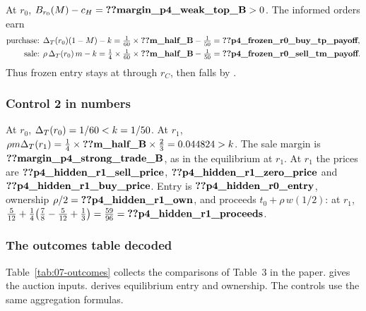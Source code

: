 At \(r_0\), \(B_{r_0}(M)-c_H=\reg{margin_p4_weak_top_B}>0\). The informed orders earn
\begin{align*}
\text{purchase: }&\DT(r_0)(1-M)-k=\tfrac1{60}\times\reg{m_half_B}-\tfrac1{50}=\reg{p4_frozen_r0_buy_tp_payoff},\\
\text{sale: }&\rho\,\DT(r_0)\,m-k=\tfrac14\times\tfrac1{60}\times\reg{m_half_B}-\tfrac1{50}=\reg{p4_frozen_r0_sell_tm_payoff}.
\end{align*}
Thus frozen entry stays at  through \(r_C\), then falls by .

\subsubsection{Control 2 in numbers}

At \(r_0\), \(\Delta_T(r_0)=1/60<k=1/50\). At \(r_1\),
\(\rho m\DT(r_1)=\tfrac14\times\reg{m_half_B}\times\tfrac23=0.044824>k\).
The sale margin is \(\reg{margin_p4_strong_trade_B}\), as in the equilibrium at \(r_1\).
At \(r_1\) the prices are \(\reg{p4_hidden_r1_sell_price}\), \(\reg{p4_hidden_r1_zero_price}\) and
\(\reg{p4_hidden_r1_buy_price}\). Entry is
\(\reg{p4_hidden_r0_entry}\), ownership \(\rho/2=\reg{p4_hidden_r1_own}\), and proceeds \(t_0+\rho\,w(1/2)\): at \(r_1\),
\(\tfrac5{12}+\tfrac14\bigl(\tfrac78-\tfrac5{12}+\tfrac13\bigr)=\tfrac{59}{96}=\reg{p4_hidden_r1_proceeds}\).

\subsubsection{The outcomes table decoded}\label{sec:07_controls-table}

Table~\ref{tab:07-outcomes} collects the comparisons of Table~3 in the paper.
 gives the auction inputs.
 derives equilibrium entry and ownership.
The controls use the same aggregation formulas.

